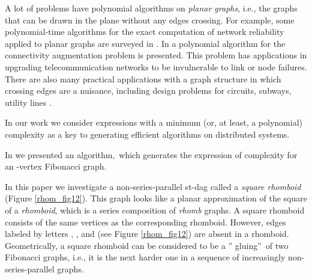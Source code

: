 \documentclass[11pt]{article}\usepackage{amsmath}
\begin{document}
A lot of problems have polynomial algorithms on \textit{planar graphs}, i.e.,
the graphs that can be drawn in the plane without any edges crossing. For
example, some polynomial-time algorithms for the exact computation of network
reliability applied to planar graphs are surveyed in \cite{PoS}. In \cite{PrB}
a polynomial algorithm for the connectivity augmentation problem is presented.
This problem has applications in upgrading telecommunication networks to be
invulnerable to link or node failures. There are also many practical
applications with a graph structure in which crossing edges are a nuisance,
including design problems for circuits, subways, utility lines \cite{Fle}.

In our work we consider expressions with a minimum (or, at least, a
polynomial) complexity as a key to generating efficient algorithms on
distributed systems.

In \cite{KoL} we presented an algorithm,\ which generates the expression of
 complexity for an -vertex Fibonacci graph.

In this paper we investigate a non-series-parallel st-dag called a
\textit{square rhomboid} (Figure \ref{rhom_fig12}). This graph looks like a
planar approximation of the square of a \textit{rhomboid}, which is a series
composition of \textit{rhomb} graphs. A square rhomboid consists of the same
vertices as the corresponding rhomboid. However, edges labeled by letters ,
, and  (see Figure \ref{rhom_fig12}) are absent in a rhomboid.
Geometrically, a square rhomboid can be considered to be a \textquotedblright
gluing\textquotedblright\ of two Fibonacci graphs, i.e., it is the next harder
one in a sequence of increasingly non-series-parallel graphs.
\end{document}
